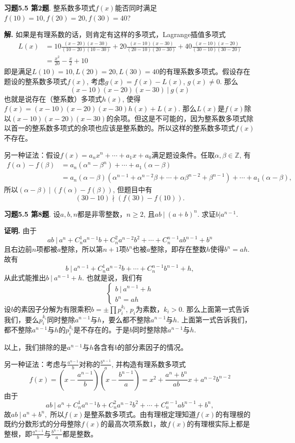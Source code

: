 {\bf 习题5.5 第2题}. 整系数多项式$f(x)$能否同时满足$f(10)=10, f(20)=20, f(30)=40$?

{\bf 解.} 如果是有理系数的话，则肯定有这样的多项式，Lagrange插值多项式
\begin{align*}
L(x) & = 10\frac{(x-20)(x-30)}{(10-20)(10-30)} + 20\frac{(x-10)(x-30)}{(20-10)(20-30)} + 40\frac{(x-10)(x-20)}{(30-10)(30-20)} \\
& = \frac{x^2}{20} - \frac{x}{2} + 10
\end{align*}
即是满足$L(10)=10, L(20)=20, L(30)=40$的有理系数多项式。假设存在题设的整系数多项式$f(x)$, 考虑$g(x) = f(x) - L(x)$, $g(x) \neq 0$. 那么
$$(x-10)(x-20)(x-30) \ |\ g(x)$$
也就是说存在（整系数）多项式$h(x)$, 使得$f(x) = (x-10)(x-20)(x-30)h(x) + L(x)$. 那么$L(x)$是$f(x)$除以$(x-10)(x-20)(x-30)$的余项。但这是不可能的，因为整系数多项式除以首一的整系数多项式的余项也应该是整系数的。所以这样的整系数多项式$f(x)$不存在。

另一种证法：假设$f(x) = a_nx^n + \cdots + a_1x + a_0$满足题设条件。任取$\alpha,\beta\in\mathbb{Z}$, 有
\begin{align*}
f(\alpha) - f(\beta) & = a_n(\alpha^n-\beta^n) + \cdots + a_1(\alpha-\beta) \\
& = a_n(\alpha-\beta)(\alpha^{n-1}+\alpha^{n-2}\beta+\cdots+\alpha\beta^{n-2}+\beta^{n-1}) + \cdots + a_1(\alpha-\beta),
\end{align*}
所以$(\alpha-\beta) \ |\ (f(\alpha) - f(\beta))$, 但题目中有
$$(30-10) \nmid (f(30)-f(10)).$$


\newpageorvspace


{\bf 习题5.5 第8题}. 设$a,b,n$都是非零整数，$n\geqslant 2$, 且$ab\ |\ (a+b)^n$. 求证$b|a^{n-1}$.

{\bf 证明.} 由于
$$ab\ |\ a^n + C_n^1a^{n-1}b + C_n^2a^{n-2}b^2 + \cdots + C_n^{n-1}ab^{n-1} + b^n$$
且右边前$n$项都被$a$整除，所以第$n+1$项$b^n$也被$a$整除，即存在整数$h$使得$b^n = ah$. 故有
$$b\ |\ a^{n-1} + C_n^1a^{n-2}b + \cdots + C_n^{n-1}b^{n-1} + h,$$
从此式能推出$b\ |\ a^{n-1} + h$. 也就是说，我们有
$$
\begin{cases}
b\ |\ a^{n-1} + h \\
b^n = ah
\end{cases}
$$
设$b$的素因子分解为有限乘积$b = \pm \prod p_i^{k_i}$, $p_i$为素数，$k_i>0$. 那么上面第一式告诉我们，要么$p_i^{k_i}$同时整除$a^{n-1}$与$h$，要么都不整除$a^{n-1}$与$h$. 上面第一式告诉我们，都不整除$a^{n-1}$与$h$的$p_i^{k_i}$是不存在的。于是$b$同时整除除$a^{n-1}$与$h$.

以上，我们排除的是$a^{n-1}$与$h$各含有$b$的部分素因子的情况。

另一种证法：考虑与$\frac{a^{n-1}}{b}$对称的$\frac{b^{n-1}}{a}$, 并构造有理系数多项式
$$f(x) = \left(x-\frac{a^{n-1}}{b}\right) \left(x-\frac{b^{n-1}}{a}\right) = x^2 + \frac{a^n+b^n}{ab} x + a^{n-2}b^{n-2}$$
由于
$$ab\ |\ a^n + C_n^1a^{n-1}b + C_n^2a^{n-2}b^2 + \cdots + C_n^{n-1}ab^{n-1} + b^n,$$
故$ab\ |\ a^n + b^n,$ 所以$f(x)$是整系数多项式。由有理根定理知道$f(x)$的有理根的既约分数形式的分母整除$f(x)$的最高次项系数1，故$f(x)$的有理根实际上都是整根，即$\frac{a^{n-1}}{b}$与$\frac{b^{n-1}}{a}$都是整数。



